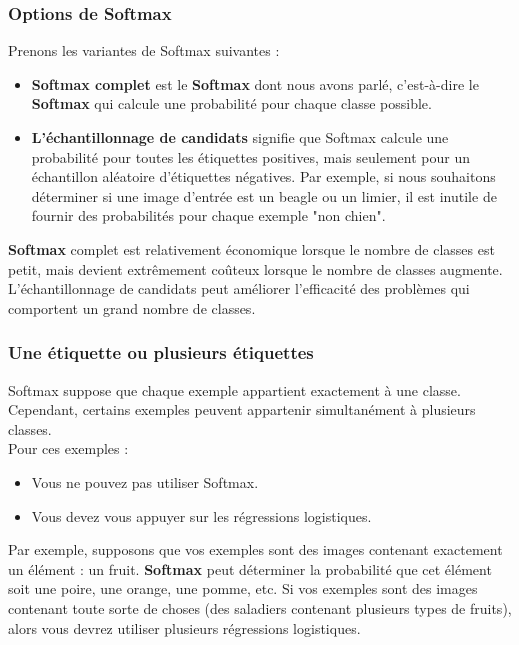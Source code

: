 \documentclass[french]{article}
\begin{document}
\subsubsection{Options de Softmax}
Prenons les variantes de Softmax suivantes :\\
\begin{itemize}[label=$\Diamond$]
	\item \textbf{Softmax complet} est le \textbf{Softmax} dont nous avons parlé, c'est-à-dire le \textbf{Softmax} qui calcule une probabilité pour chaque classe possible.\\
	\item \textbf{L'échantillonnage de candidats} signifie que Softmax calcule une probabilité pour toutes les étiquettes positives, mais seulement pour un échantillon aléatoire d'étiquettes négatives. Par exemple, si nous souhaitons déterminer si une image d'entrée est un beagle ou un limier, il est inutile de fournir des probabilités pour chaque exemple "non chien".\\
\end{itemize}
\textbf{Softmax} complet est relativement économique lorsque le nombre de classes est petit, mais devient extrêmement coûteux lorsque le nombre de classes augmente. L'échantillonnage de candidats peut améliorer l'efficacité des problèmes qui comportent un grand nombre de classes.

\subsubsection{Une étiquette ou plusieurs étiquettes}
Softmax suppose que chaque exemple appartient exactement à une classe. Cependant, certains exemples peuvent appartenir simultanément à plusieurs classes.\\ Pour ces exemples :
\begin{itemize}[label=\textbullet]
	\item Vous ne pouvez pas utiliser Softmax.
	\item Vous devez vous appuyer sur les régressions logistiques.\\
\end{itemize}
Par exemple, supposons que vos exemples sont des images contenant exactement un élément : un fruit. \textbf{Softmax} peut déterminer la probabilité que cet élément soit une poire, une orange, une pomme, etc. Si vos exemples sont des images contenant toute sorte de choses (des saladiers contenant plusieurs types de fruits), alors vous devrez utiliser plusieurs régressions logistiques.
	
\end{document}
